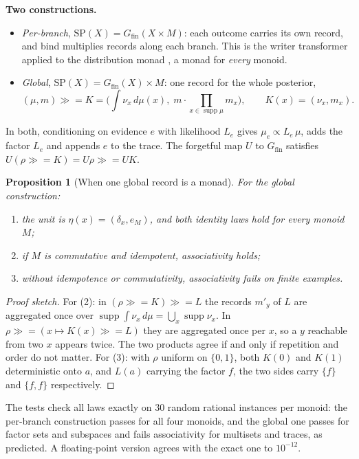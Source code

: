 \documentclass[11pt]{article}
\newtheorem{proposition}[theorem]{Proposition}
\theoremstyle{definition}
\theoremstyle{remark}
\begin{document}
\textbf{Two constructions.}
\begin{itemize}
  \item \emph{Per-branch}, $\mathrm{SP}(X)=G_{\mathrm{fin}}(X\times M)$: each outcome carries its own record, and bind multiplies records along each branch. This is the writer transformer applied to the distribution monad \cite{lianghudakjones95}, a monad for \emph{every} monoid.
  \item \emph{Global}, $\mathrm{SP}(X)=G_{\mathrm{fin}}(X)\times M$: one record for the whole posterior,
  \[
  (\mu,m)\gg\!\!= K=\Big(\textstyle\int\nu_x\,d\mu(x),\; m\cdot\prod_{x\in\operatorname{supp}\mu}m_x\Big),\qquad K(x)=(\nu_x,m_x).
  \]
\end{itemize}
In both, conditioning on evidence $e$ with likelihood $L_e$ gives $\mu_e\propto L_e\,\mu$, adds the factor $L_e$ and appends $e$ to the trace. The forgetful map $U$ to $G_{\mathrm{fin}}$ satisfies $U(\rho\gg\!\!=K)=U\rho\gg\!\!= UK$.

\begin{proposition}[When one global record is a monad]\label{prop:sp}
For the global construction:
\begin{enumerate}
  \item the unit is $\eta(x)=(\delta_x,e_M)$, and both identity laws hold for every monoid $M$;
  \item if $M$ is commutative and idempotent, associativity holds;
  \item without idempotence or commutativity, associativity fails on finite examples.
\end{enumerate}
\end{proposition}
\begin{proof}[Proof sketch]
For (2): in $(\rho\gg\!\!=K)\gg\!\!=L$ the records $m'_y$ of $L$ are aggregated once over $\operatorname{supp}\int\nu_x\,d\mu=\bigcup_{x}\operatorname{supp}\nu_x$. In $\rho\gg\!\!=(x\mapsto K(x)\gg\!\!=L)$ they are aggregated once per $x$, so a $y$ reachable from two $x$ appears twice. The two products agree if and only if repetition and order do not matter. For (3): with $\rho$ uniform on $\{0,1\}$, both $K(0)$ and $K(1)$ deterministic onto $a$, and $L(a)$ carrying the factor $f$, the two sides carry $\{f\}$ and $\{f,f\}$ respectively.
\end{proof}
The tests check all laws exactly on $30$ random rational instances per monoid: the per-branch construction passes for all four monoids, and the global one passes for factor sets and subspaces and fails associativity for multisets and traces, as predicted. A floating-point version agrees with the exact one to $10^{-12}$.
\end{document}
